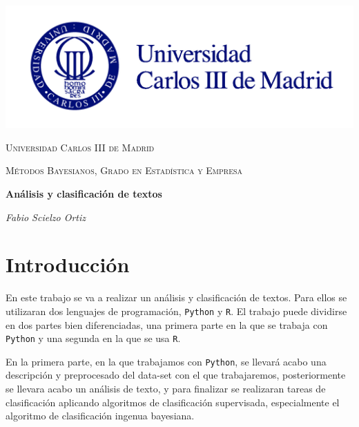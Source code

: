\documentclass[
  11pt,
  a4paper,
]{article}
\author{}
\date{\vspace{-2.5em}}
\begin{document}

\graphicspath{ {images/} }

\begin{center}
\centering
	\includegraphics[width=1.5\textwidth]{uc3m}\par\vspace{1cm}
{\scshape\LARGE Universidad Carlos III de Madrid \par}
	\vspace{1cm}
	{\scshape\Large Métodos Bayesianos, Grado en Estadística y Empresa \par}
	\vspace{1.5cm}
	{\huge\bfseries Análisis  y clasificación de textos \par}
	\vspace{2cm}
	{\Large\itshape Fabio Scielzo Ortiz \par}
	\date{28 de octubre de 2022}
	\vfill
	\vfill
\end{center}

\newpage
\tableofcontents
\newpage

\hypertarget{introducciuxf3n}{%
\section{Introducción}\label{introducciuxf3n}}

En este trabajo se va a realizar un análisis y clasificación de textos.
Para ellos se utilizaran dos lenguajes de programación, \texttt{Python}
y \texttt{R}. El trabajo puede dividirse en dos partes bien
diferenciadas, una primera parte en la que se trabaja con
\texttt{Python} y una segunda en la que se usa \texttt{R}.

En la primera parte, en la que trabajamos con \texttt{Python}, se
llevará acabo una descripción y preprocesado del data-set con el que
trabajaremos, posteriormente se llevara acabo un análisis de texto, y
para finalizar se realizaran tareas de clasificación aplicando
algoritmos de clasificación supervisada, especialmente el algoritmo de
clasificación ingenua bayesiana.
\end{document}
